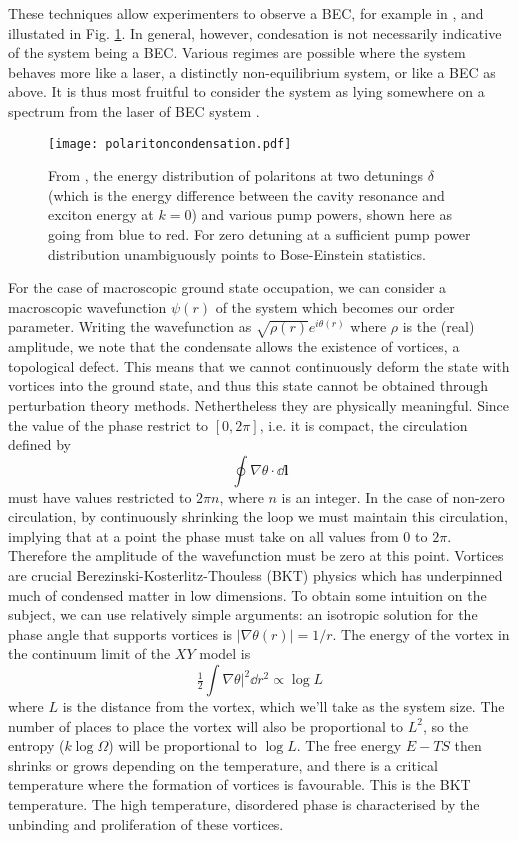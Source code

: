 \documentclass[letterpaper, 10 pt, conference]{IEEEtran}  %
\newcommand{\myvec}[1]{\boldsymbol{#1}}
\newcommand{\fig}[1]{Fig. #1}
\begin{document}
These techniques allow experimenters to observe a BEC, for example in \cite{PhysRevLett.118.016602}, and illustated in \fig{\ref{fig:polariton-condesation}}. 
In general, however, condesation is not necessarily indicative of the system being a BEC. 
Various regimes are possible where the system behaves more like a laser, a distinctly non-equilibrium system, or like a BEC as above.
It is thus most fruitful to consider the system as lying somewhere on a spectrum from the laser of BEC system \cite{Byrnes2014}. 
\begin{figure}[htbp!]
	\centering
	\texttt{[image: polaritoncondensation.pdf]}
	\caption{From \cite{PhysRevLett.118.016602}, the energy distribution of polaritons at two detunings $\delta$ (which is the energy difference between the cavity resonance and exciton energy at $k=0$) and various pump powers, shown here as going from blue to red. For zero detuning at a sufficient pump power distribution unambiguously points to Bose-Einstein statistics.}
	\label{fig:polariton-condesation}
\end{figure}
For the case of macroscopic ground state occupation, we can consider a macroscopic wavefunction $\psi(r)$ of the system which becomes our order parameter. 
Writing the wavefunction as $\sqrt{\rho(r)} e^{i \theta (r)}$ where $\rho$ is the (real) amplitude, we note that the condensate allows the existence of vortices, a topological defect.
This means that we cannot continuously deform the state with vortices into the ground state, and thus this state cannot be obtained through perturbation theory methods.
Nethertheless they are physically meaningful.  
Since the value of the phase restrict to $[0, 2 \pi]$, i.e. it is compact, the circulation defined by 
\[
\oint \nabla \theta \cdot \dd{\myvec{l}} 
\]
must have values restricted to $2\pi n$, where $n$ is an integer. 
In the case of non-zero circulation, by continuously shrinking the loop we must maintain this circulation, implying that at a point the phase must take on all values from 0 to $2\pi$. 
Therefore the amplitude of the wavefunction must be zero at this point.
Vortices are crucial Berezinski-Kosterlitz-Thouless (BKT) physics which has underpinned much of condensed matter in low dimensions. 
To obtain some intuition on the subject, we can use relatively simple arguments: an isotropic solution for the phase angle that supports vortices is $|\nabla \theta(r)| =1/r$. 
The energy of the vortex in the continuum limit of the $XY$ model is
\[
\tfrac12 \int \nabla \theta |^2 \dd r^2 \propto \log L
\]
where $L$ is the distance from the vortex, which we'll take as the system size. 
The number of places to place the vortex will also be proportional to $L^2$, so the entropy ($k \log \Omega$) will be proportional to $\log L$. 
The free energy $E - TS$ then shrinks or grows depending on the temperature, and there is a critical temperature where the formation of vortices is favourable. 
This is the BKT temperature.
The high temperature, disordered phase is characterised by the unbinding and proliferation of these vortices.
 
\end{document}
